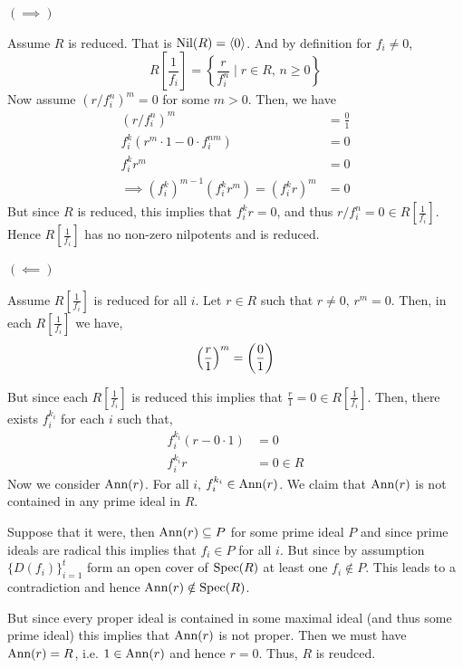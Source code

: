 \documentclass[12pt]{article}
\begin{document}
\begin{solution}
    \bbni

    $(\implies)$ 

    Assume $R$ is reduced. That is $\text{Nil}(R) = \langle 0 \rangle$. And by definition for $f_i \neq 0$, \[R \left[ \frac{1}{f_i}\right] = \left\{\frac{r}{f_i^n} \mid r \in R, \, n \geq 0\right\}\]
    Now assume $\left(r / f_i^n\right)^m = 0$ for some $m > 0$. Then, we have 
    \begin{align*}
        \left(r / f_i^n\right)^m &= \frac{0}{1} \\ 
        f_i^k (r^m \cdot 1 - 0 \cdot f_i^{nm}) &= 0 \\ 
        f_i^k r^m &= 0 \\ 
        \implies (f_i^k)^{m-1}(f_i^k r^m) = (f_i^kr)^m &= 0
    \end{align*}
    But since $R$ is reduced, this implies that $f^k_ir = 0$, and thus $r/f_i^n = 0 \in R\left[\frac{1}{f_i}\right]$. Hence $ R\left[\frac{1}{f_i}\right]$ has no non-zero nilpotents and is reduced.

    \bbni

    $(\impliedby)$

    Assume $R \left[\frac{1}{f_i}\right]$ is reduced for all $i$. 
    Let $r \in R$ such that $r \neq 0, \, r^m = 0$. Then, in each $R\left[\frac{1}{f_i}\right]$ we have, 
    \[\left(\frac{r}{1}\right)^m = \left(\frac{0}{1}\right)\]
   
    But since each $R\left[\frac{1}{f_i}\right]$ is reduced this implies that $\frac{r}{1} = 0 \in  R\left[\frac{1}{f_i}\right]$. Then, there exists $f_i^{k_i}$ for each $i$ such that, 
    \begin{align*}
        f_i^{k_i} (r - 0 \cdot 1) &= 0 \\ 
        f_i^{k_i} r &= 0  \in R
    \end{align*} 
    Now we consider $\operatorname{\text{Ann}}(r)$. For all $i$, $f_i^{k_i} \in \operatorname{\text{Ann}}(r)$. 
    We claim that $\operatorname{\text{Ann}}(r)$ is not contained in any prime ideal in $R$. 
    
    Suppose that it were, then $\operatorname{\text{Ann}}(r) \subseteq P$ for some prime ideal $P$ and since prime ideals are radical this implies that $f_i \in P$ for all $i$. But since by assumption $\{D(f_i)\}_{i=1}^t$ form an open cover of $\operatorname{Spec}(R)$ at least one $f_i \notin P$. This leads to a contradiction and hence $\operatorname{\text{Ann}}(r) \notin \operatorname{Spec}(R)$. 
    
    But since every proper ideal is contained in some maximal ideal (and thus some prime ideal) this implies that $\operatorname{\text{Ann}}(r)$ is not proper. Then we must have $\operatorname{\text{Ann}}(r) = R$, i.e. $1 \in \operatorname{\text{Ann}}(r)$ and hence $r = 0$. Thus, $R$ is reudced. 
\end{solution}
\end{document}
